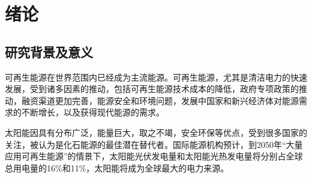 \chapter{绪论}
\label{chapter:Introduction}


\section{研究背景及意义}

可再生能源在世界范围内已经成为主流能源。可再生能源，尤其是清洁电力的快速发展，受到诸多因素的推动，包括可再生能源技术成本的降低，政府专项政策的推动，融资渠道更加完善，能源安全和环境问题，发展中国家和新兴经济体对能源需求的不断增长，以及获得现代能源的需求。

太阳能因具有分布广泛，能量巨大，取之不竭，安全环保等优点，受到很多国家的关注，被认为是化石能源的最佳潜在替代者。国际能源机构预计，到2050年“大量应用可再生能源”的情景下，太阳能光伏发电量和太阳能光热发电量将分别占全球总用电量的16\%和11\%，太阳能将成为全球最大的电力来源\cite{IEA2014}。

